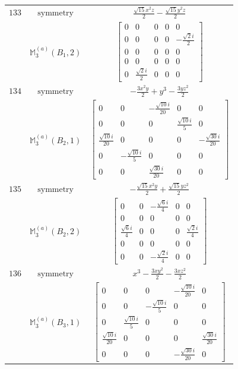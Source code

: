 \documentclass[fleqn,8pt,landscape]{jsarticle}
\begin{document}
\begin{longtable}{ccc}
$ 133 $ & $ \text{symmetry} $ & $ \frac{\sqrt{15} x^{2} z}{2} - \frac{\sqrt{15} y^{2} z}{2} $ \\
$  $ & $ \mathbb{M}_{3}^{(a)}(B_{1},2) $ & $ \begin{bmatrix} 0 & 0 & 0 & 0 & 0 \\ 0 & 0 & 0 & 0 & - \frac{\sqrt{2} i}{2} \\ 0 & 0 & 0 & 0 & 0 \\ 0 & 0 & 0 & 0 & 0 \\ 0 & \frac{\sqrt{2} i}{2} & 0 & 0 & 0 \end{bmatrix} $ \\ \hline
$ 134 $ & $ \text{symmetry} $ & $ - \frac{3 x^{2} y}{2} + y^{3} - \frac{3 y z^{2}}{2} $ \\
$  $ & $ \mathbb{M}_{3}^{(a)}(B_{2},1) $ & $ \begin{bmatrix} 0 & 0 & - \frac{\sqrt{10} i}{20} & 0 & 0 \\ 0 & 0 & 0 & \frac{\sqrt{10} i}{5} & 0 \\ \frac{\sqrt{10} i}{20} & 0 & 0 & 0 & - \frac{\sqrt{30} i}{20} \\ 0 & - \frac{\sqrt{10} i}{5} & 0 & 0 & 0 \\ 0 & 0 & \frac{\sqrt{30} i}{20} & 0 & 0 \end{bmatrix} $ \\ \hline
$ 135 $ & $ \text{symmetry} $ & $ - \frac{\sqrt{15} x^{2} y}{2} + \frac{\sqrt{15} y z^{2}}{2} $ \\
$  $ & $ \mathbb{M}_{3}^{(a)}(B_{2},2) $ & $ \begin{bmatrix} 0 & 0 & - \frac{\sqrt{6} i}{4} & 0 & 0 \\ 0 & 0 & 0 & 0 & 0 \\ \frac{\sqrt{6} i}{4} & 0 & 0 & 0 & \frac{\sqrt{2} i}{4} \\ 0 & 0 & 0 & 0 & 0 \\ 0 & 0 & - \frac{\sqrt{2} i}{4} & 0 & 0 \end{bmatrix} $ \\ \hline
$ 136 $ & $ \text{symmetry} $ & $ x^{3} - \frac{3 x y^{2}}{2} - \frac{3 x z^{2}}{2} $ \\
$  $ & $ \mathbb{M}_{3}^{(a)}(B_{3},1) $ & $ \begin{bmatrix} 0 & 0 & 0 & - \frac{\sqrt{10} i}{20} & 0 \\ 0 & 0 & - \frac{\sqrt{10} i}{5} & 0 & 0 \\ 0 & \frac{\sqrt{10} i}{5} & 0 & 0 & 0 \\ \frac{\sqrt{10} i}{20} & 0 & 0 & 0 & \frac{\sqrt{30} i}{20} \\ 0 & 0 & 0 & - \frac{\sqrt{30} i}{20} & 0 \end{bmatrix} $ \\ \hline

\end{longtable}
\end{document}
